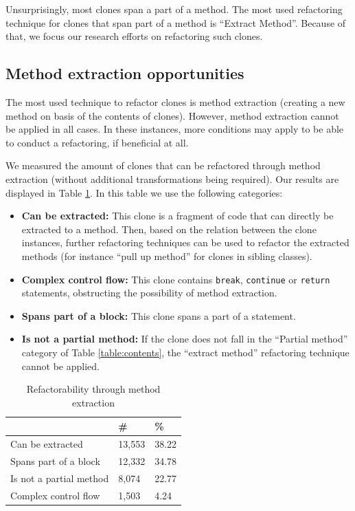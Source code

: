\documentclass[a4paper]{article}
\begin{document}
Unsurprisingly, most clones span a part of a method. The most used refactoring technique for clones that span part of a method is ``Extract Method''. Because of that, we focus our research efforts on refactoring such clones.

\subsection{Method extraction opportunities}\label{chap:mergingdups}
The most used technique to refactor clones is method extraction (creating a new method on basis of the contents of clones). However, method extraction cannot be applied in all cases. In these instances, more conditions may apply to be able to conduct a refactoring, if beneficial at all.

We measured the amount of clones that can be refactored through method extraction (without additional transformations being required). Our results are displayed in Table \ref{table:refactorability}. In this table we use the following categories:
\begin{itemize}
    \item \textbf{Can be extracted:} This clone is a fragment of code that can directly be extracted to a method. Then, based on the relation between the clone instances, further refactoring techniques can be used to refactor the extracted methods (for instance ``pull up method'' for clones in sibling classes).
    \item \textbf{Complex control flow:} This clone contains \texttt{break}, \texttt{continue} or \texttt{return} statements, obstructing the possibility of method extraction.
    \item \textbf{Spans part of a block:} This clone spans a part of a statement.
    \item \textbf{Is not a partial method:} If the clone does not fall in the ``Partial method'' category of Table \ref{table:contents}, the ``extract method'' refactoring technique cannot be applied.
\end{itemize}

\begin{table}[H]
  \begin{center}
  \caption{Refactorability through method extraction} \label{table:refactorability}
  \medskip
\begin{tabular}{|l|l|l|}
\hline
\textbf{}         & \textbf{\#} & \textbf{\%} \\ \hline
Can be extracted     & 13,553 & 38.22 \\ \hline
Spans part of a block  & 12,332 & 34.78 \\ \hline
Is not a partial method   & 8,074 & 22.77 \\ \hline
Complex control flow & 1,503 & 4.24 \\ \hline
\end{tabular}
\end{center}
\end{table}
\end{document}
